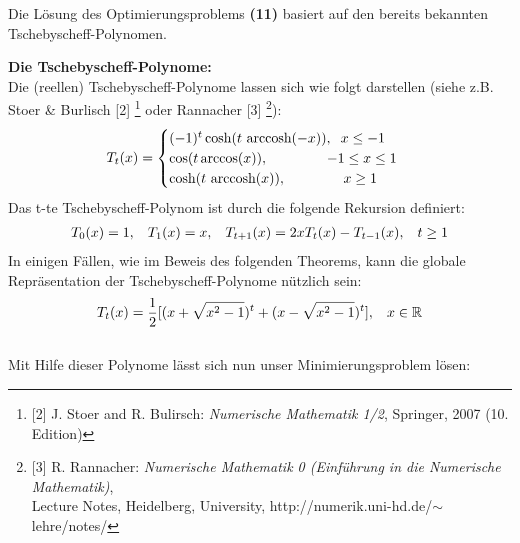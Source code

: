 \documentclass[12pt,a4paper,numbers=endperiod]{scrartcl}
\theoremstyle{definition}
\newcommand{\arccosh}{\text{ arccosh}}
\def\RR{{\mathbb R}}
\begin{document}
Die Lösung des Optimierungsproblems \textbf{(11)} basiert auf den bereits bekannten Tschebyscheff-Polynomen. 

\textbf{Die Tschebyscheff-Polynome:}\\
	Die (reellen) Tschebyscheff-Polynome lassen sich wie folgt darstellen (siehe z.B. Stoer \& Burlisch [2] \footnote{[2] J. Stoer and R. Bulirsch: \textit{Numerische Mathematik 1/2}, Springer, 2007 (10. Edition)} oder Rannacher [3] \footnote{[3] R. Rannacher: \textit{Numerische Mathematik 0 (Einführung in die Numerische Mathematik)},\\ Lecture Notes, Heidelberg, University, http://numerik.uni-hd.de/$\sim$lehre/notes/}):
	\begin{gather}
	T_t(x) = 
	\begin{cases}
	(-1)^t \cosh(t \arccosh(-x)), \hspace{2mm} x \leq -1\\
	\cos(t \arccos(x)), \hspace{14,8mm} -1 \leq x \leq 1\\
	\cosh(t \arccosh(x)), \hspace{14,5mm} x \geq 1
	\end{cases}
	\end{gather}
	Das t-te Tschebyscheff-Polynom ist durch die folgende Rekursion definiert:
	\begin{gather}
	T_0(x) = 1, \hspace{3mm} T_1(x) = x, \hspace{3mm} T_{t+1}(x)= 2xT_t(x) - T_{t-1}(x), \hspace{3mm} t \geq 1
	\end{gather}
	In einigen Fällen, wie im Beweis des folgenden Theorems, kann die globale Repräsentation der Tschebyscheff-Polynome nützlich sein:
	\begin{gather}
	T_t(x) = \frac{1}{2} [(x + \sqrt{x^2-1})^t + (x- \sqrt{x^2-1})^t], \hspace{3mm} x \in \RR
	\end{gather}\\


Mit Hilfe dieser Polynome lässt sich nun unser Minimierungsproblem lösen:
\end{document}
